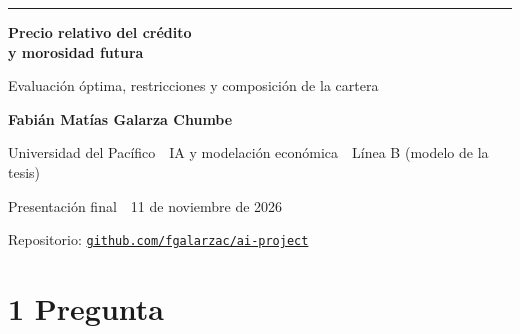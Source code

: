 \documentclass[aspectratio=169,10pt,t]{beamer}
\begin{document}
\begin{frame}[plain]
\vspace{15mm}
{\color{accent}\rule{22mm}{1.6pt}}\par\vspace{3mm}
{\fontsize{22}{26}\selectfont\bfseries\color{navy}
Precio relativo del crédito\\[.15em]y morosidad futura\par}
\vspace{3mm}
{\large Evaluación óptima, restricciones y composición de la cartera\par}
\vspace{9mm}
\textbf{Fabián Matías Galarza Chumbe}\par
{\small Universidad del Pacífico \,\textbullet\, IA y modelación económica \,\textbullet\,
Línea B (modelo de la tesis)\par
Presentación final \,\textbullet\, 11 de noviembre de 2026\par}
\vspace{7mm}
{\small Repositorio:
\href{https://github.com/fgalarzac/ai-project}{\color{navy}\texttt{github.com/fgalarzac/ai-project}}\par}
\end{frame}

\section{1 Pregunta}
\end{document}
